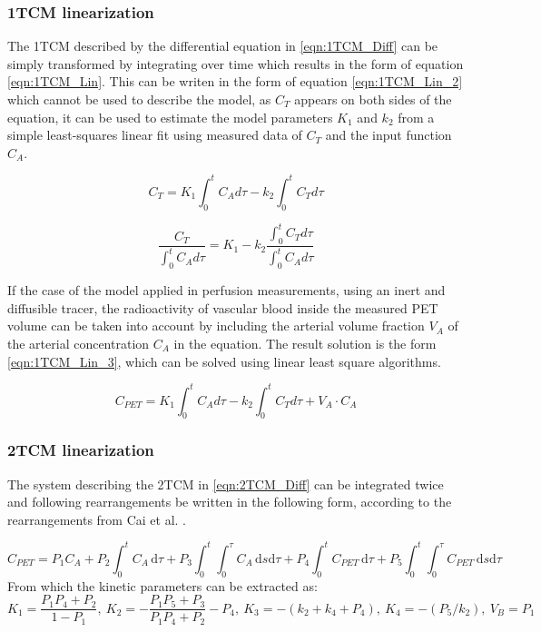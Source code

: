 \subsubsection{1TCM linearization}
The 1TCM described by the differential equation in \ref{eqn:1TCM_Diff} can be simply transformed by integrating over time which results in the form of equation \ref{eqn:1TCM_Lin}. This can be writen in the form of equation \ref{eqn:1TCM_Lin_2} which cannot be used to describe the model, as $C_T$ appears on both sides of the equation, it can be used to estimate the model parameters $K_1$ and $k_2$ from a simple least-squares linear fit using measured data of $C_T$ and the input function $C_A$. 

\begin{equation}
C_T = K_1 \int_{0}^{t} C_A d\tau  - k_2 \int_{0}^{t} C_T d\tau
\label{eqn:1TCM_Lin}
\end{equation}

\begin{equation}
\frac{C_T}{\int_{0}^{t} C_A d\tau} = K_1 - k_2 \frac{\int_{0}^{t} C_T d\tau}{\int_{0}^{t} C_A d\tau} 
\label{eqn:1TCM_Lin_2}
\end{equation}

If the case of the model applied in perfusion measurements, using an inert and diffusible tracer, the radioactivity of vascular blood inside the measured PET volume can be taken into account by including the arterial volume fraction  $V_A$ of the arterial concentration $C_A$ in the equation. The result solution is the form \ref{eqn:1TCM_Lin_3}, which can be solved using linear least square algorithms.

\begin{equation}
C_{PET} = K_1 \int_{0}^{t} C_A d\tau - k_2 \int_{0}^{t} C_T d\tau + V_A \cdot C_A
\label{eqn:1TCM_Lin_3}
\end{equation}

\subsubsection{2TCM linearization}
The system describing the 2TCM in \ref{eqn:2TCM_Diff} can be integrated twice and following rearrangements be written in the following form, according to the rearrangements from Cai et al. \cite{Cai2002}.   

\begin{equation} \label{microLinearization_with_k4}
C_{PET} = P_1 C_A + P_2 \int_0^t \! C_A \, \mathrm{d}\tau + P_3 \int_0^t \int_0^\tau \! C_A \,\mathrm{d}s \mathrm{d}\tau
+ P_4 \int_0^t \! C_{PET} \, \mathrm{d}\tau + P_5 \int_0^t \int_0^\tau \! C_{PET} \,\mathrm{d}s \mathrm{d}\tau
\end{equation}
\newline From which the kinetic parameters can be extracted as: 
\newline
\begin{equation} \label{ParamsLinearization_with_k4}
K_1=\frac{P_1 P_4 + P_2}{1-P_1} ,\  K_2=- \frac{P_1 P_5 + P_3}{P_1 P_4 + P_2} - P_4 ,\ K_3=-(k_2 + k_4 + P_4) 
,\ K_4=-(P_5/k_2) ,\  V_B = P_1 
\end{equation}

